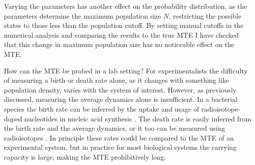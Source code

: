 Varying the parameters has another effect on the probability distribution, as the parameters determine the maximum population size $N$, restricting the possible states to those less than the population cutoff. 
By setting manual cutoffs in the numerical analysis and comparing the results to the true MTE I have checked that this change in maximum population size has no noticeable effect on the MTE. 

How can the MTE be probed in a lab setting? 
For experimentalists the difficulty of measuring a birth or death rate alone, as it changes with something like population density, varies with the system of interest. 
However, as previously discussed, measuring the average dynamics alone is insufficient. 
In a bacterial species the birth rate can be inferred by the uptake and usage of radioisotope-doped nucleotides in nucleic acid synthesis \cite{Kirchman1982}. 
The death rate is easily inferred from the birth rate and the average dynamics, or it too can be measured using radioisotopes \cite{Servais1985}. %
In principle these rates could be compared to the MTE of an experimental system, but in practice for most biological systems the carrying capacity is large, making the MTE prohibitively long. 
